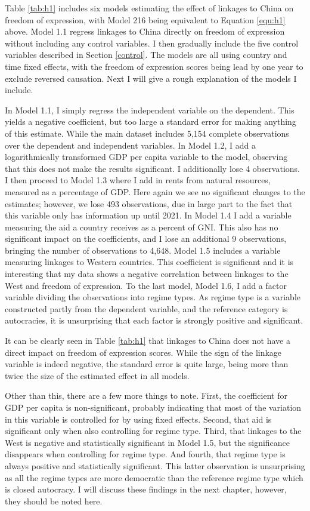 Table \ref{tab:h1} includes six models estimating the effect of linkages to China on freedom of expression, with Model 216 being equivalent to Equation \ref{equ:h1} above. Model 1.1 regress linkages to China directly on freedom of expression without including any control variables. I then gradually include the five control variables described in Section \ref{control}. The models are all using country and time fixed effects, with the freedom of expression scores being lead by one year to exclude reversed causation. Next I will give a rough explanation of the models I include.

In Model 1.1, I simply regress the independent variable on the dependent. This yields a negative coefficient, but too large a standard error for making anything of this estimate. While the main dataset includes 5,154 complete observations over the dependent and independent variables. In Model 1.2, I add a logarithmically transformed GDP per capita variable to the model, observing that this does not make the results significant. I additionally lose 4 observations. I then proceed to Model 1.3 where I add in rents from natural resources, measured as a percentage of GDP. Here again we see no significant changes to the estimates; however, we lose 493 observations, due in large part to the fact that this variable only has information up until 2021. In Model 1.4 I add a variable measuring the aid a country receives as a percent of GNI. This also has no significant impact on the coefficients, and I lose an additional 9 observations, bringing the number of observations to 4,648. Model 1.5 includes a variable measuring linkages to Western countries. This coefficient is significant and it is interesting that my data shows a negative correlation between linkages to the West and freedom of expression. To the last model, Model 1.6, I add a factor variable dividing the observations into regime types. As regime type is a variable constructed partly from the dependent variable, and the reference category is autocracies, it is unsurprising that each factor is strongly positive and significant.

It can be clearly seen in Table \ref{tab:h1} that linkages to China does not have a direct impact on freedom of expression scores. While the sign of the linkage variable is indeed negative, the standard error is quite large, being more than twice the size of the estimated effect in all models.

Other than this, there are a few more things to note. First, the coefficient for GDP per capita is non-significant, probably indicating that most of the variation in this variable is controlled for by using fixed effects. Second, that aid is significant only when also controlling for regime type. Third, that linkages to the West is negative and statistically significant in Model 1.5, but the significance disappears when controlling for regime type. And fourth, that regime type is always positive and statistically significant. This latter observation is unsurprising as all the regime types are more democratic than the reference regime type which is closed autocracy. I will discuss these findings in the next chapter, however, they should be noted here.


